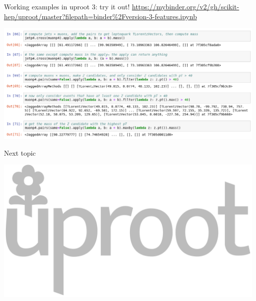 \documentclass[aspectratio=169]{beamer}
\begin{document}
\begin{frame}{Working examples in uproot 3: try it out!}
\vspace{0.25 cm}
\textcolor{blue}{\small\url{https://mybinder.org/v2/gh/scikit-hep/uproot/master?filepath=binder\%2Fversion-3-features.ipynb}}

\vspace{0.15 cm}
\includegraphics[width=\linewidth]{tutorial-screenshot.png}
\end{frame}

\begin{frame}{Next topic}
\Large
\vspace{1 cm}
\begin{center}
\includegraphics[width=0.3\linewidth]{uproot-logo.pdf}
\end{center}
\end{frame}
\end{document}
